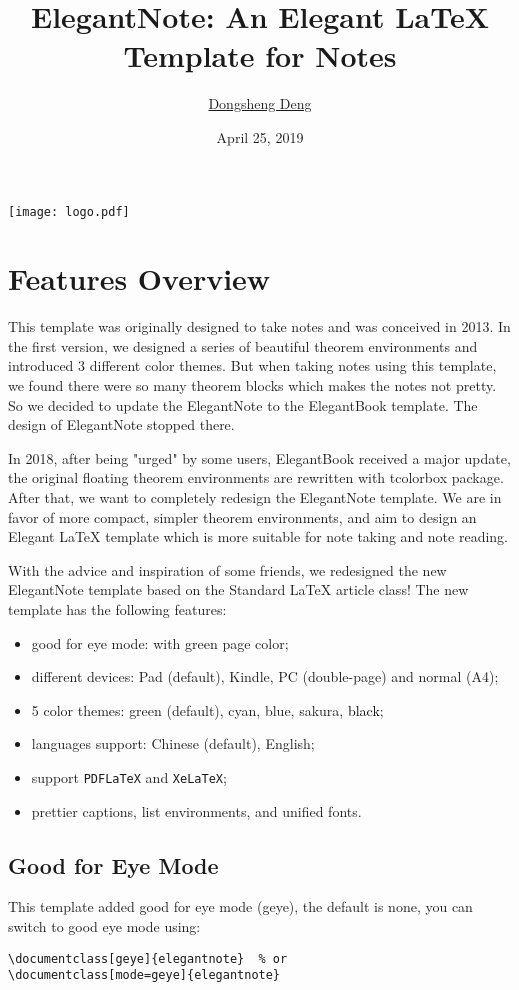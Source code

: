 \documentclass[geye,green,pad,en]{elegantnote}
\title{ElegantNote: An Elegant \LaTeX{} Template for Notes}
\author{\href{https://ddswhu.me/}{Dongsheng Deng}}
\institute{\href{https://elegantlatex.org/}{Elegant\LaTeX{} Program}}
\date{April 25, 2019}
\begin{document}
\maketitle
\centerline{\texttt{[image: logo.pdf]}}

\section{Features Overview}
This template was originally designed to take notes and was conceived in 2013. In the first version, we designed a  series of beautiful theorem environments and introduced 3 different color themes. But when taking notes using this template, we found there were so many theorem blocks which makes the notes not pretty. So we decided to update the ElegantNote to the ElegantBook template. The design of ElegantNote stopped there.

In 2018, after being "urged" by some users, ElegantBook received a major update, the original floating theorem environments are rewritten with tcolorbox package. After that, we want to completely redesign the ElegantNote template. We are in favor of more compact, simpler theorem environments, and aim to design an Elegant \LaTeX{} template which is more suitable for note taking and note reading.

With the advice and inspiration of some friends, we redesigned the new ElegantNote template based on the Standard \LaTeX{} article class! The new template has the following features:

\begin{itemize}
\item good for eye mode: with green page color;
\item different devices: Pad (default), Kindle, PC (double-page) and normal (A4);
\item 5 color themes: \textcolor{egreen}{green} (default), \textcolor{ecyan}{cyan}, \textcolor{eblue}{blue}, \textcolor{sakura}{sakura}, \textcolor{black}{black};
\item languages support: Chinese (default), English;
\item support \lstinline{PDFLaTeX} and \lstinline{XeLaTeX};
\item prettier captions, list environments, and unified fonts.
\end{itemize}

\subsection{Good for Eye Mode}
This template added good for eye mode (geye), the default is none, you can switch to good eye mode using:
\begin{lstlisting}[frame=none]  
\documentclass[geye]{elegantnote}  % or
\documentclass[mode=geye]{elegantnote}
\end{lstlisting}
\end{document}
